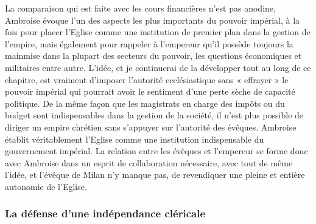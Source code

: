 La comparaison qui est faite avec les cours financières n’est pas anodine, Ambroise évoque l’un des aspects les plus importants du pouvoir impérial, à la fois pour placer l’Eglise comme une institution de premier plan dans la gestion de l’empire, mais également pour rappeler à l’empereur qu’il possède toujours la mainmise dans la plupart des secteurs du pouvoir, les questions économiques et militaires entre autre. L’idée, et je continuerai de la développer tout au long de ce chapitre, est vraiment d’imposer l’autorité ecclésiastique sans « effrayer » le pouvoir impérial qui pourrait avoir le sentiment d’une perte sèche de capacité politique. De la même façon que les magistrats en charge des impôts ou du budget sont indispensables dans la gestion de la société, il n’est plus possible de diriger un empire chrétien sans s’appuyer sur l’autorité des évêques. Ambroise établit véritablement l’Eglise comme une institution indispensable du gouvernement impérial. La relation entre les évêques et l’empereur se forme donc avec Ambroise dans un esprit de collaboration nécessaire, avec tout de même l’idée, et l’évêque de Milan n’y manque pas, de revendiquer une pleine et entière autonomie de l’Eglise.

\bigskip

\subsubsection{La défense d'une indépendance cléricale}

